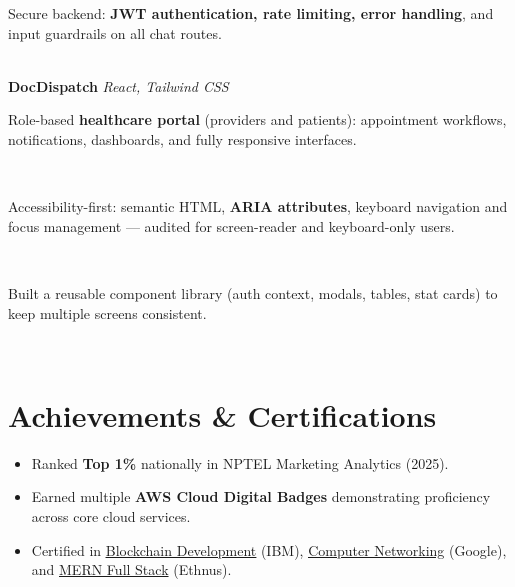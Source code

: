 \documentclass[a4paper,10pt]{article}
\begin{document}
\noindent\makebox[1.5em][l]{--}%
\parbox[t]{\dimexpr\linewidth-1.5em\relax}{%
Secure backend: \textbf{JWT authentication, rate limiting, error handling}, and input guardrails on all chat routes.} \\[6pt]


\textbf{DocDispatch} \hfill \textit{React, Tailwind CSS} \\[-5pt]


\noindent\makebox[1.5em][l]{--}%
\parbox[t]{\dimexpr\linewidth-1.5em\relax}{%
Role-based \textbf{healthcare portal} (providers and patients): appointment workflows, notifications, dashboards, and fully responsive interfaces.} \\[0pt]


\noindent\makebox[1.5em][l]{--}%
\parbox[t]{\dimexpr\linewidth-1.5em\relax}{%
Accessibility-first: semantic HTML, \textbf{ARIA attributes}, keyboard navigation and focus management --- audited for screen-reader and keyboard-only users.} \\[0pt]


\noindent\makebox[1.5em][l]{--}%
\parbox[t]{\dimexpr\linewidth-1.5em\relax}{%
Built a reusable component library (auth context, modals, tables, stat cards) to keep multiple screens consistent.} \\[4pt]


\section{Achievements \& Certifications}
\begin{itemize}[leftmargin=*]
\item Ranked \textbf{Top 1\%} nationally in NPTEL Marketing Analytics (2025).
\item Earned multiple \textbf{AWS Cloud Digital Badges} demonstrating proficiency across core cloud services.
\item Certified in \href{https://courses.ibmcep.cognitiveclass.ai/certificates/ebd0a0cde11f49fd85e0585514c8a752}{\underline{Blockchain Development}} (IBM),
\href{https://coursera.org/share/c47bf1223e7454e273d86e44a50fb76a}{\underline{Computer Networking}} (Google),
and \underline{MERN Full Stack} (Ethnus).
\end{itemize}
\end{document}
